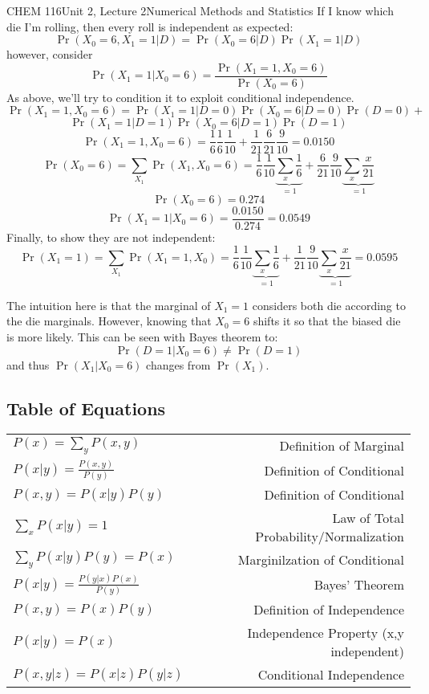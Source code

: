 \documentclass{article}
\begin{document}
\begin{tdoc}{CHEM 116}{Unit 2, Lecture 2}{Numerical Methods and Statistics}
If I know which die I'm rolling, then every roll is independent
as expected: 
\[
\Pr (X_0 = 6, X_1 = 1 | D) = \Pr (X_0 = 6 | D) \Pr (X_1 = 1 | D)
\]
however, consider 
\[
\Pr (X_1 = 1 | X_0 = 6) = \frac{\Pr(X_1 = 1, X_0 = 6)}{\Pr (X_0 = 6)}
\]
As above, we'll try to condition it to exploit conditional
independence.
\[
\Pr(X_1 = 1, X_0 = 6) = \Pr(X_1 = 1 | D = 0) \Pr(X_0 = 6 | D = 0) \Pr (D = 0) + 
\]
\[
\Pr(X_1 = 1 | D = 1) \Pr(X_0 = 6 | D = 1) \Pr (D = 1)
\]
\[
\Pr(X_1 = 1, X_0 = 6) = \frac{1}{6}\frac{1}{6}\frac{1}{10} + \frac{1}{21}\frac{6}{21}\frac{9}{10} = 0.0150
\]
\[
\Pr(X_0 = 6) = \sum_{X_1} \Pr(X_1, X_0 = 6) = \frac{1}{6}\frac{1}{10}\underbrace{\sum_{x} \frac{1}{6}}_{=1} + \frac{6}{21}\frac{9}{10} \underbrace{\sum_{x} \frac{x}{21}}_{=1}
\]
\[
\Pr(X_0 = 6)  = 0.274
\]
\[
\Pr (X_1 = 1 | X_0 = 6) = \frac{0.0150}{0.274} = 0.0549
\]
Finally, to show they are not independent:
\[
\Pr(X_1 = 1) = \sum_{X_1} \Pr(X_1 = 1, X_0) = \frac{1}{6}\frac{1}{10}\underbrace{\sum_{x} \frac{1}{6}}_{=1} + \frac{1}{21}\frac{9}{10} \underbrace{\sum_{x} \frac{x}{21}}_{=1} = 0.0595
\]

The intuition here is that the marginal of $X_1 = 1$ considers both
die according to the die marginals. However, knowing that $X_0 = 6$
shifts it so that the biased die is more likely. This can be seen with
Bayes theorem to:
\[
\Pr(D = 1 | X_0 = 6) \neq \Pr (D=1)
\]
and thus $\Pr (X_1 | X_0 = 6)$ changes from $\Pr(X_1)$.

\subsection{Table of Equations}

  \begin{tabular}{lr}
    $P(x) = \sum_y P(x,y)$ & Definition of Marginal\vspace{0.15cm}\\
    $P(x|y) = \frac{P(x,y)}{P(y)}$ & Definition of Conditional\vspace{0.15cm}\\
    $P(x,y) = P(x|y)P(y)$ & Definition of Conditional\vspace{0.15cm}\\
    $\sum_x P(x|y) = 1$ & Law of Total Probability/Normalization\vspace{0.15cm}\\
    $\sum_y P(x|y)P(y) = P(x)$ & Marginilzation of Conditional\vspace{0.15cm}\\
    $P(x|y) = \frac{P(y|x)P(x)}{P(y)}$ & Bayes' Theorem\vspace{0.15cm}\\
    $P(x,y) = P(x)P(y)$ & Definition of Independence\vspace{0.15cm}\\
    $P(x | y) = P(x)$ & Independence Property (x,y independent)\vspace{0.15cm}\\
    $P(x,y | z) = P(x|z)P(y|z)$ & Conditional Independence\vspace{0.15cm}\\
  \end{tabular}

\end{tdoc}
\end{document}
